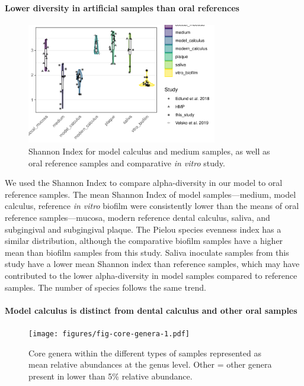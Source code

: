 \documentclass[10pt,a4paper]{article}
\begin{document}
\paragraph{Lower diversity in artificial samples than oral
references}\label{lower-diversity-in-artificial-samples-than-oral-references}

\begin{figure}
    \centering
    \includegraphics[width=0.74\textwidth]{figures/fig-shannon-compar-1.pdf}
    \caption{\label{fig-shannon-compar}Shannon Index for model calculus and
medium samples, as well as oral reference samples and comparative
\emph{in vitro} study.}
\end{figure}

We used the Shannon Index to compare alpha-diversity in our model to
oral reference samples. The mean Shannon Index of model
samples---medium, model calculus, reference \emph{in vitro} biofilm were
consistently lower than the means of oral reference samples---mucosa,
modern reference dental calculus, saliva, and subgingival and
subgingival plaque. The Pielou species evenness index has a similar
distribution, although the comparative biofilm samples have a higher
mean than biofilm samples from this study. Saliva inoculate samples from
this study have a lower mean Shannon index than reference samples, which
may have contributed to the lower alpha-diversity in model samples
compared to reference samples. The number of species follows the same
trend.

\paragraph{Model calculus is distinct from dental calculus and other
oral
samples}\label{model-calculus-is-distinct-from-dental-calculus-and-other-oral-samples}

\begin{figure}
    \centering
    \texttt{[image: figures/fig-core-genera-1.pdf]}
    \caption{\label{fig-core-genera}Core genera within the different types
of samples represented as mean relative abundances at the genus level.
Other = other genera present in lower than 5\% relative abundance.}
\end{figure}
\end{document}

